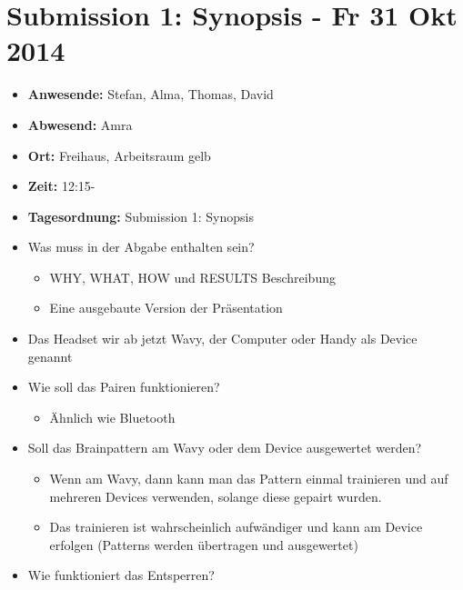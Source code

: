 \section{Submission 1: Synopsis - Fr 31 Okt
2014}\label{submission-1-synopsis---fr-31-okt-2014}

\begin{itemize}
\item
  \textbf{Anwesende:} Stefan, Alma, Thomas, David
\item
  \textbf{Abwesend:} Amra
\item
  \textbf{Ort:} Freihaus, Arbeitsraum gelb
\item
  \textbf{Zeit:} 12:15-
\item
  \textbf{Tagesordnung:} Submission 1: Synopsis
\item
  Was muss in der Abgabe enthalten sein?

  \begin{itemize}
  \itemsep1pt\parskip0pt
  \item
    WHY, WHAT, HOW und RESULTS Beschreibung
  \item
    Eine ausgebaute Version der Präsentation
  \end{itemize}
\item
  Das Headset wir ab jetzt Wavy, der Computer oder Handy als Device
  genannt
\item
  Wie soll das Pairen funktionieren?

  \begin{itemize}
  \itemsep1pt\parskip0pt
  \item
    Ähnlich wie Bluetooth
  \end{itemize}
\item
  Soll das Brainpattern am Wavy oder dem Device ausgewertet werden?

  \begin{itemize}
  \itemsep1pt\parskip0pt
  \item
    Wenn am Wavy, dann kann man das Pattern einmal trainieren und auf
    mehreren Devices verwenden, solange diese gepairt wurden.
  \item
    Das trainieren ist wahrscheinlich aufwändiger und kann am Device
    erfolgen (Patterns werden übertragen und ausgewertet)
  \end{itemize}
\item
  Wie funktioniert das Entsperren?


\end{itemize}
